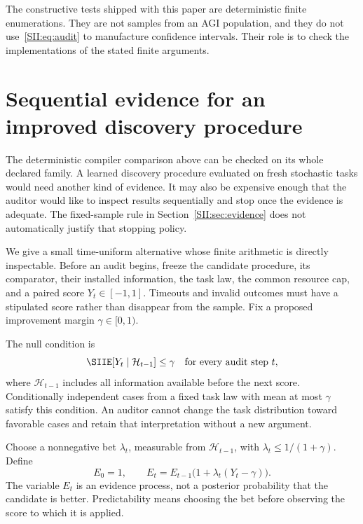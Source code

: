 The constructive tests shipped with this paper are deterministic finite enumerations. They are not samples from an AGI population, and they do not use~\eqref{SII:eq:audit} to manufacture confidence intervals. Their role is to check the implementations of the stated finite arguments.

\section{Sequential evidence for an improved discovery procedure}\label{SII:sec:anytime}
The deterministic compiler comparison above can be checked on its whole declared family. A learned discovery procedure evaluated on fresh stochastic tasks would need another kind of evidence. It may also be expensive enough that the auditor would like to inspect results sequentially and stop once the evidence is adequate. The fixed-sample rule in Section~\ref{SII:sec:evidence} does not automatically justify that stopping policy.

We give a small time-uniform alternative whose finite arithmetic is directly inspectable. Before an audit begins, freeze the candidate procedure, its comparator, their installed information, the task law, the common resource cap, and a paired score $Y_t\in[-1,1]$. Timeouts and invalid outcomes must have a stipulated score rather than disappear from the sample. Fix a proposed improvement margin $\gamma\in[0,1)$.

The null condition is
\begin{equation}\label{SII:eq:anytime-null}
\SIIE[Y_t\mid\mathcal H_{t-1}]\leq\gamma
\quad\text{for every audit step }t,
\end{equation}
where $\mathcal H_{t-1}$ includes all information available before the next score. Conditionally independent cases from a fixed task law with mean at most $\gamma$ satisfy this condition. An auditor cannot change the task distribution toward favorable cases and retain that interpretation without a new argument.

Choose a nonnegative bet $\lambda_t$, measurable from $\mathcal H_{t-1}$, with $\lambda_t\leq1/(1+\gamma)$. Define
\begin{equation}\label{SII:eq:anytime-capital}
E_0=1,\qquad E_t=E_{t-1}\bigl(1+\lambda_t(Y_t-\gamma)\bigr).
\end{equation}
The variable $E_t$ is an evidence process, not a posterior probability that the candidate is better. Predictability means choosing the bet before observing the score to which it is applied.


